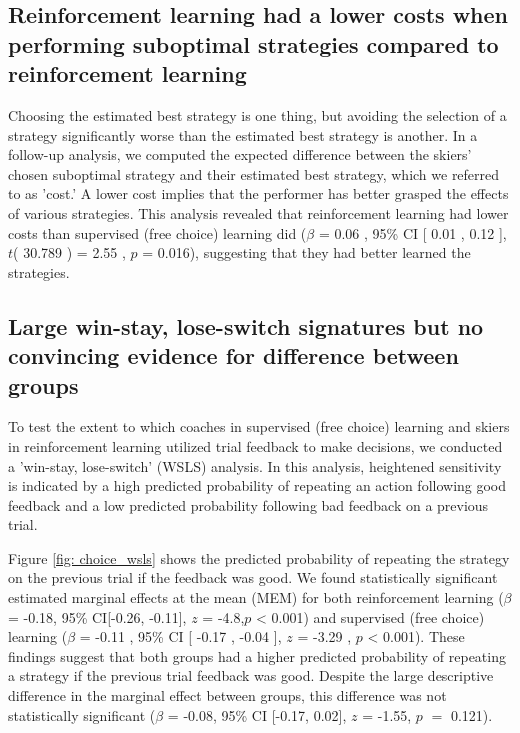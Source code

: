 \documentclass[pdflatex,sn-mathphys-num]{sn-jnl}%
\theoremstyle{thmstyleone}%
\theoremstyle{thmstyletwo}%
\theoremstyle{thmstylethree}%
\begin{document}
\subsection{Reinforcement learning had a lower costs when performing suboptimal strategies compared to  reinforcement learning}\label{subsubsec3}
Choosing the estimated best strategy is one thing, but avoiding the selection of a strategy significantly worse than the estimated best strategy is another. In a follow-up analysis, we computed the expected difference between the skiers' chosen suboptimal strategy and their estimated best strategy, which we referred to as 'cost.' A lower cost implies that the performer has better grasped the effects of various strategies. This analysis revealed that reinforcement learning had lower costs than supervised (free choice) learning did  ($\beta$ = 0.06 , 95\% CI [ 0.01 ,  0.12 ], $t$( 30.789 ) = 2.55 , $p$  =  0.016), suggesting that they had better learned the strategies.

\subsection{Large win-stay, lose-switch signatures but no convincing evidence for difference between groups}\label{wsls}
To test the extent to which coaches in supervised (free choice) learning and skiers in reinforcement learning utilized trial feedback to make decisions, we conducted a 'win-stay, lose-switch' (WSLS) analysis. In this analysis, heightened sensitivity is indicated by a high predicted probability of repeating an action following good feedback and a low predicted probability following bad feedback on a previous trial.

Figure \ref{fig: choice_wsls} shows the predicted probability of repeating the strategy on the previous trial if the feedback was good. We found statistically significant estimated marginal effects at the mean (MEM) for both reinforcement learning  ($\beta$ = -0.18, 95\% CI[-0.26, -0.11], $z$ = -4.8,$p$ < 0.001) and supervised (free choice) learning ($\beta$ = -0.11 , 95\% CI [ -0.17 ,  -0.04 ], $z$ = -3.29 , $p$  <  0.001). These findings suggest that both groups had a higher predicted probability of repeating a strategy if the previous trial feedback was good. Despite the large descriptive difference in the marginal effect between groups, this difference was not statistically  significant ($\beta$ = -0.08, 95\% CI [-0.17, 0.02], $z$ = -1.55, $p$ $=$ 0.121).
\end{document}
